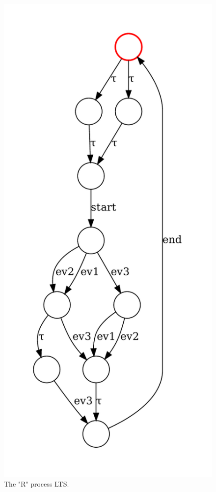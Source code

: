 \begin{figure}[htb]
	\caption{\label{lts-example}The "R" process LTS.}
	\begin{center}
		\includegraphics[scale=0.75]{images/LTS.pdf}
	\end{center}
\end{figure}

